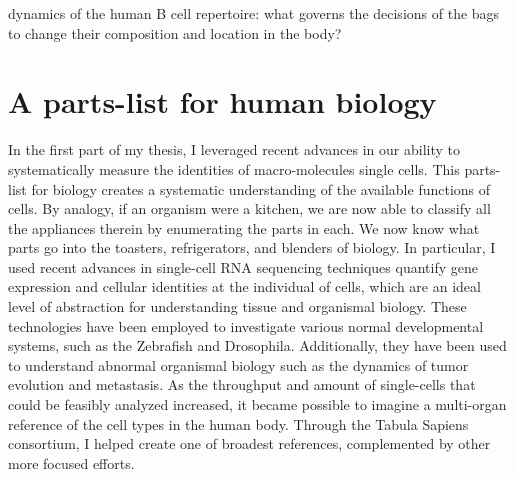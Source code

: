 dynamics of the human B cell repertoire: what governs the decisions of the bags to change their composition and location in the body?     

\section{A parts-list for human biology} 
In the first part of my thesis, I leveraged recent advances in our ability to systematically measure the identities of macro-molecules single cells. This parts-list for biology creates a systematic understanding of the available functions of cells. By analogy, if an organism were a kitchen, we are now able to classify all the appliances therein by enumerating the parts in each. We now know what parts go into the toasters, refrigerators, and blenders of biology. In particular, I used recent advances in single-cell RNA sequencing techniques quantify gene expression and cellular identities at the individual of cells\cite{klein_droplet_2015, macosko2015highly}, which are an ideal level of abstraction for understanding tissue and organismal biology. These technologies have been employed to investigate various normal developmental systems, such as the Zebrafish and Drosophila\cite{wagner_single-cell_2018,ingle2015drosophila}. Additionally, they have been used to understand abnormal organismal biology such as the dynamics of tumor evolution and metastasis\cite{pierson2017single}. As the throughput and amount of single-cells that could be feasibly analyzed increased\cite{linnarsson2016single}, it became possible to imagine a multi-organ reference of the cell types in the human body\cite{regev2017human}. Through the Tabula Sapiens consortium, I helped create one of broadest references\cite{tabula_sapiens_consortium_tabula_2022}, complemented by other more focused efforts\cite{dominguez_conde_cross-tissue_2022}.
